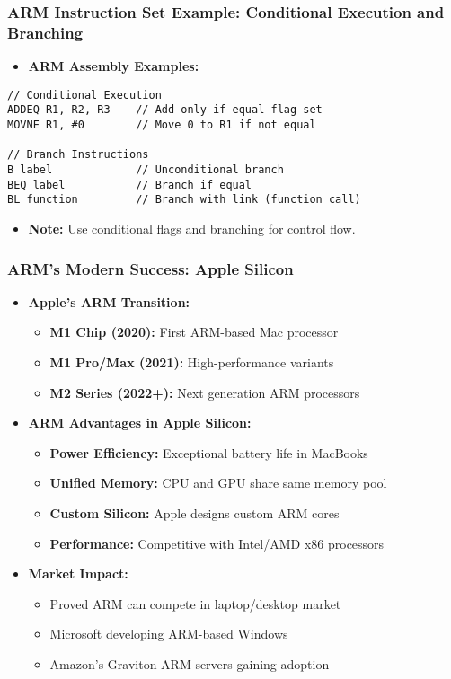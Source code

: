 \begin{frame}[fragile]
\frametitle{ARM Instruction Set Example: Conditional Execution and Branching}
\begin{itemize}
    \item \textbf{ARM Assembly Examples:}
\end{itemize}
\begin{verbatim}
// Conditional Execution
ADDEQ R1, R2, R3    // Add only if equal flag set
MOVNE R1, #0        // Move 0 to R1 if not equal

// Branch Instructions
B label             // Unconditional branch
BEQ label           // Branch if equal
BL function         // Branch with link (function call)
\end{verbatim}
\begin{itemize}
    \item \textbf{Note:} Use conditional flags and branching for control flow.
\end{itemize}
\end{frame}

\begin{frame}
\frametitle{ARM's Modern Success: Apple Silicon}
\begin{itemize}
    \item \textbf{Apple's ARM Transition:}
    \begin{itemize}
        \item \textbf{M1 Chip (2020):} First ARM-based Mac processor
        \item \textbf{M1 Pro/Max (2021):} High-performance variants
        \item \textbf{M2 Series (2022+):} Next generation ARM processors
    \end{itemize}
    \item \textbf{ARM Advantages in Apple Silicon:}
    \begin{itemize}
        \item \textbf{Power Efficiency:} Exceptional battery life in MacBooks
        \item \textbf{Unified Memory:} CPU and GPU share same memory pool
        \item \textbf{Custom Silicon:} Apple designs custom ARM cores
        \item \textbf{Performance:} Competitive with Intel/AMD x86 processors
    \end{itemize}
    \item \textbf{Market Impact:}
    \begin{itemize}
        \item Proved ARM can compete in laptop/desktop market
        \item Microsoft developing ARM-based Windows
        \item Amazon's Graviton ARM servers gaining adoption
    \end{itemize}
\end{itemize}
\end{frame}

